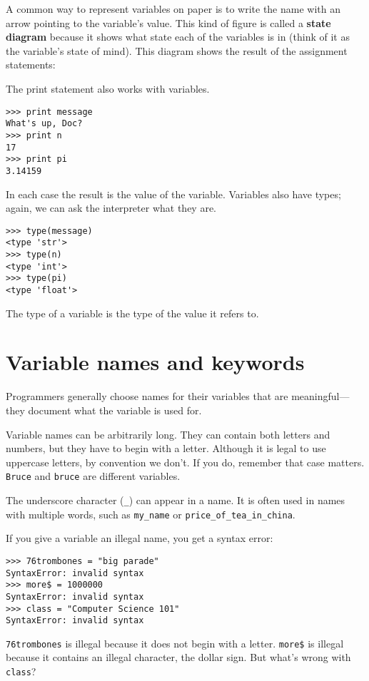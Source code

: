A common way to represent variables on paper is to write the name with
an arrow pointing to the variable's value.  This kind of figure is
called a {\bf state diagram} because it shows what state each of the
variables is in (think of it as the variable's state of mind).
This diagram shows the result of the assignment statements:

\beforefig
\centerline{}
\afterfig

The print statement also works with variables.

\beforeverb
\begin{verbatim}
>>> print message
What's up, Doc?
>>> print n
17
>>> print pi
3.14159
\end{verbatim}
\afterverb
%
In each case the result is the value of the variable.
Variables also have types; again, we can ask the
interpreter what they are.

\beforeverb
\begin{verbatim}
>>> type(message)
<type 'str'>
>>> type(n)
<type 'int'>
>>> type(pi)
<type 'float'>
\end{verbatim}
\afterverb
%
The type of a variable is the type of the value it
refers to.


\section{Variable names and keywords}

Programmers generally choose names for their variables that
are meaningful---they document what the variable is used for.

Variable names can be arbitrarily long.  They can contain
both letters and numbers, but they have to begin with a letter.
Although it is legal to use uppercase letters, by convention
we don't.  If you do, remember that case matters.  {\tt Bruce}
and {\tt bruce} are different variables.

The underscore character ({\tt \_}) can appear in a name.
It is often used in names with multiple words, such as
{\tt my\_name} or {\tt price\_of\_tea\_in\_china}.


If you give a variable an illegal name, you get a syntax error:

\pagebreak
\beforeverb
\begin{verbatim}
>>> 76trombones = "big parade"
SyntaxError: invalid syntax
>>> more$ = 1000000
SyntaxError: invalid syntax
>>> class = "Computer Science 101"
SyntaxError: invalid syntax
\end{verbatim}
\afterverb
%
{\tt 76trombones} is illegal because it does not begin with a letter.
{\tt more\$} is illegal because it contains an illegal character, the dollar
sign.  But what's wrong with {\tt class}?

